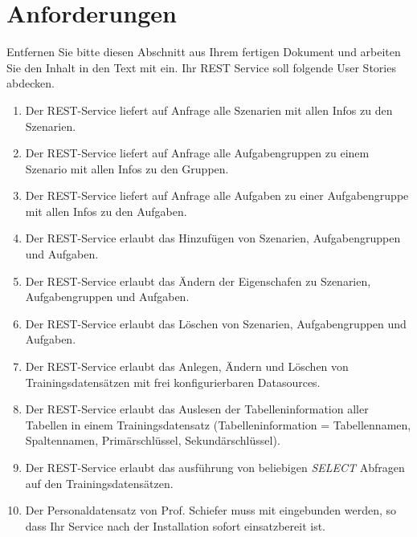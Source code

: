 \documentclass[fleqn,10pt,ngerman]{SelfArx}
\affiliation{\textit{Hochschule Kaiserslautern}} %
\affiliation{\textbf{Corresponding author}: Braun Daniel} %
\begin{document}
	
	\flushbottom %
	
	\maketitle %
	
	\tableofcontents %
	
	\thispagestyle{empty} %
	
	
	\section*{Anforderungen}
	Entfernen Sie bitte diesen Abschnitt aus Ihrem fertigen Dokument und arbeiten Sie den Inhalt in den Text mit ein. 
	Ihr REST Service soll folgende User Stories abdecken.
	
	\begin{enumerate}
		
		\item Der REST-Service liefert auf Anfrage alle Szenarien mit allen Infos zu den Szenarien. 
		\item  Der REST-Service liefert auf Anfrage alle Aufgabengruppen zu einem Szenario mit allen Infos zu den Gruppen. 
		\item  Der REST-Service liefert auf Anfrage alle Aufgaben zu einer Aufgabengruppe mit allen Infos zu den Aufgaben. 
		\item  Der REST-Service erlaubt das Hinzufügen von Szenarien, Aufgabengruppen und Aufgaben.
		\item  Der REST-Service erlaubt das Ändern der Eigenschafen zu Szenarien, Aufgabengruppen und Aufgaben.
		\item  Der REST-Service erlaubt das Löschen von Szenarien, Aufgabengruppen und Aufgaben.
		\item  Der REST-Service erlaubt das Anlegen, Ändern und Löschen von Trainingsdatensätzen mit frei konfigurierbaren Datasources.
		\item  Der REST-Service erlaubt das Auslesen der Tabelleninformation aller Tabellen in einem Trainingsdatensatz (Tabelleninformation = Tabellennamen, Spaltennamen, Prim\"arschl\"ussel, Sekund\"arschl\"ussel).
		\item  Der REST-Service erlaubt das ausf\"uhrung von beliebigen 
		\textit{SELECT} Abfragen auf den Trainingsdatens\"atzen.
		\item Der Personaldatensatz von Prof. Schiefer muss mit eingebunden werden, so dass Ihr Service nach der Installation sofort einsatzbereit ist. 	
		
		
	\end{enumerate}
	
\end{document}
